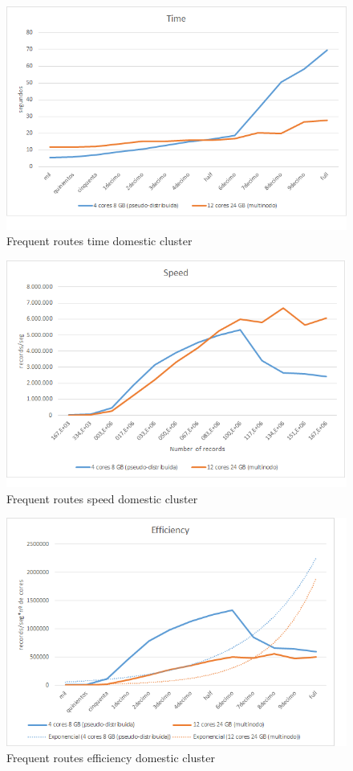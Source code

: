 \begin{figure}[htp!]
	\centering
	\caption{Frequent routes time domestic cluster}
	\label{tfd}
	\vspace{5pt}
	\includegraphics[scale=0.8]{geng/tfd}
\end{figure}
\begin{figure}[htp!]
	\centering
	\caption{Frequent routes speed domestic cluster}
	\label{sfd}
	\vspace{5pt}
	\includegraphics[scale=0.85]{geng/sfd}
\end{figure}
\begin{figure}[htp!]
	\centering
	\caption{Frequent routes efficiency domestic cluster}
	\label{efd}
	\vspace{5pt}
	\includegraphics[scale=0.85]{geng/efd}
\end{figure}

